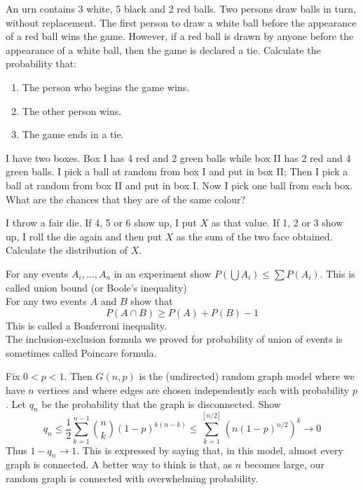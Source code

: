 \documentclass[12pt]{article}
\newenvironment{question}[2][Question]{\begin{trivlist}
\item[\hskip \labelsep {\bfseries #1}\hskip \labelsep {\bfseries #2.}]}{\end{trivlist}}
\begin{document}
\begin{question}{11}
An urn contains 3 white, 5 black and 2 red balls. Two persons draw balls in turn, without replacement. The first person to draw a white ball before the appearance of a red ball wins the game. However, if a red ball is drawn by anyone before the appearance of a white ball, then the game is declared a tie. Calculate the probability that:
\begin{enumerate}
\item The person who begins the game wins.
\item The other person wins.
\item The game ends in a tie.
\end{enumerate}
\end{question}

\begin{question}{12}
I have two boxes. Box I has 4 red and 2 green balls while box II has 2 red and 4 green balls. I pick a ball at random from box I and put in box II; Then I pick a ball at random from box II and put in box I. Now I pick one ball from each box. What are the chances that they are of the same colour?
\end{question}

\begin{question}{13}
I throw a fair die. If 4, 5 or 6 show up, I put $X$ as that value. If 1, 2 or 3 show up, I roll the die again and then put $X$ as the sum of the two face obtained. Calculate the distribution of $X$.
\end{question}

\begin{question}{14}
For any events $A_i,\ldots,A_n$ in an experiment show $P(\bigcup A_i) \leq \sum{P(A_i)}$. This is called union bound (or Boole's inequality)\\ For any two events $A$ and $B$ show that $$P(A\cap B) \geq P(A) + P(B) - 1$$
This is called a Bonferroni inequality.\\
The inclusion-exclusion formula we proved for probability of union of events is sometimes called Poincare formula.
\end{question}

\begin{question}{15}
Fix $0 < p < 1$. Then $G(n,p)$ is the (undirected) random graph model where we have $n$ vertices and where edges are chosen independently each with probability $p$. Let $q_n$ be the probability that the graph is disconnected. Show $$q_n \leq \frac{1}{2} \sum_{k=1}^{n-1}{n \choose k}(1-p)^{k(n-k)} \leq \sum_{k=1}^{[n/2]}{(n(1-p)^{n/2})^k} \to 0$$
Thus $1-q_n \to 1$. This is expressed by saying that, in this model, almost every graph is connected. A better way to think is that, as $n$ becomes large, our random graph is connected with overwhelming probability.
\end{question}
\end{document}
